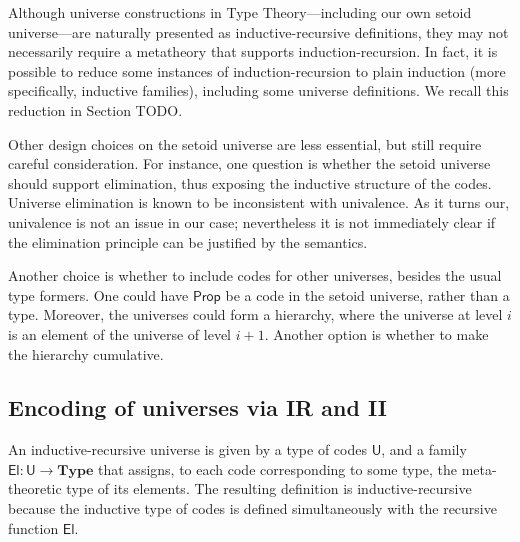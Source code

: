 \documentclass{easychair}
\newcommand{\mType}{\mathbf{Type}}
\newcommand{\Prop}{\textsf{Prop}}
\newcommand{\U}{\textsf{U}}
\newcommand{\El}{\textsf{El}}
\begin{document}
Although universe constructions in Type Theory---including our own setoid
universe---are naturally presented as inductive-recursive definitions, they
may not necessarily require a metatheory that supports induction-recursion. In
fact, it is possible to reduce some instances of induction-recursion to plain
induction (more specifically, inductive families), including some universe
definitions. We recall this reduction in Section TODO.


Other design choices on the setoid universe are less essential, but still
require careful consideration. For instance, one question is whether the setoid
universe should support elimination, thus exposing the inductive structure of
the codes. Universe elimination is known to be inconsistent with univalence. As
it turns our, univalence is not an issue in our case; nevertheless it is not
immediately clear if the elimination principle can be justified by the
semantics.

Another choice is whether to include codes for other universes, besides the
usual type formers. One could have $\Prop$ be a code in the setoid universe,
rather than a type. Moreover, the universes could form a hierarchy, where the
universe at level $i$ is an element of the universe of level $i+1$. Another
option is whether to make the hierarchy cumulative.


\subsection{Encoding of universes via IR and II}

An inductive-recursive universe is given by a type of codes $\U$, and a family
$\El : \U \to \mType$ that assigns, to each code corresponding to some type, the
meta-theoretic type of its elements. The resulting definition is
inductive-recursive because the inductive type of codes is defined
simultaneously with the recursive function $\El$.
\end{document}
